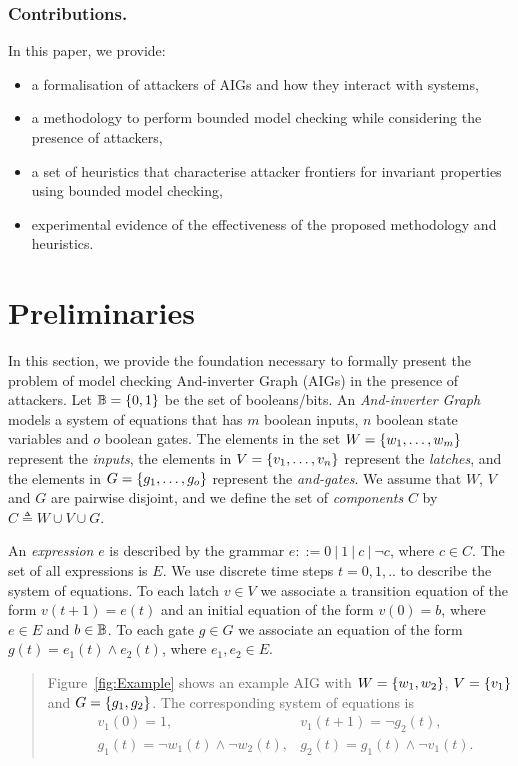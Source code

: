 {\subsubsection{Contributions.} In this paper, we provide:
\begin{itemize}
\item a formalisation of attackers of AIGs and how they interact with systems, 
\item a methodology to perform bounded model checking while considering the presence of attackers,
\item a set of heuristics that characterise attacker frontiers for invariant properties using bounded model checking,
\item experimental evidence of the effectiveness of the proposed methodology and heuristics.
\end{itemize}
\section{Preliminaries}
\label{sec:preliminaries}
In this section, we provide the foundation necessary to formally present 
the problem of model checking {And-inverter Graph} (AIGs) in the presence of attackers. 
Let $\mathbb{B}=\left\{0,1\right\}$ be the set of booleans/bits. An \emph{And-inverter Graph} 
models a system of equations that has $m$ boolean 
inputs, $n$ boolean state variables and $o$ boolean gates. The elements in the set 
$W=\left\{w_1, \ldots, w_m\right\}$ represent the \emph{inputs}, the elements in 
$V=\left\{v_1, \ldots, v_n\right\}$ represent the \emph{latches}, and the elements in 
$G=\left\{g_1, \ldots, g_o\right\}$ represent the \emph{and-gates}. We assume that $W$, $V$ and $G$ are pairwise disjoint, and we define the set of \emph{components} $C$ by $C\triangleq W\cup V \cup G$. 

An \emph{expression} $e$ is described by the grammar $e::= 0\ |\ 1\ |\ c\ |\ \lnot c$, where $c \in C$. The set of all expressions is $E$. We use discrete time steps $t=0,1,..$ to describe the system of equations. To each latch $v\in V$ we associate a transition {equation} of the form $v(t+1) = e(t)$ and an initial equation of the form $v(0)=b$, where $e\in E$ and $b\in \mathbb{B}$. To each gate $g\in G$ we associate an equation of the form $g(t)=e_1(t)\land e_2(t)$, where $e_1,e_2\in E$. 

\begin{quote}
\begin{example}
\label{ex:simple}
Figure~\ref{fig:Example} shows an example AIG with $W=\left\{w_1,w_2\right\}$, $V=\left\{v_1\right\}$ and $G=\left\{g_1,g_2\right\}$. The corresponding system of equations is
\begin{align*}
&v_1(0)=1, & v_1(t+1)=\lnot g_2(t),\\
&g_1(t)=\lnot w_1(t) \land \lnot w_2(t), & g_2(t)=g_1(t) \land \lnot v_1(t).
\end{align*}


\end{example}
\end{quote}}
